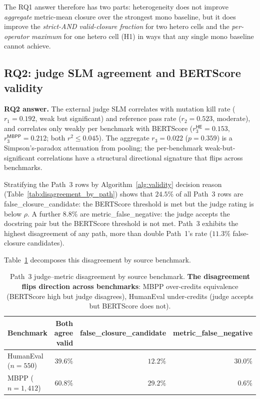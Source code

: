 The RQ1 answer therefore has two parts: heterogeneity does not improve \emph{aggregate} metric-mean closure over the strongest mono baseline, but it does improve the \emph{strict-AND valid-closure fraction} for two hetero cells and the \emph{per-operator maximum} for one hetero cell (H1) in ways that any single mono baseline cannot achieve.

\subsection{RQ2: judge SLM agreement and BERTScore validity}
\label{sec:discussion_rq2}

\textbf{RQ2 answer.} The external judge SLM correlates with mutation kill rate ($r_1 = 0.192$, weak but significant) and reference pass rate ($r_2 = 0.523$, moderate), and correlates only weakly per benchmark with BERTScore ($r_3^{\textsf{HE}} = 0.153$, $r_3^{\textsf{MBPP}} = 0.212$; both $r^2 \leq 0.045$). The aggregate $r_3 = 0.022$ ($p = 0.359$) is a Simpson's-paradox attenuation from pooling; the per-benchmark weak-but-significant correlations have a structural directional signature that flips across benchmarks.



Stratifying the Path~3 rows by Algorithm~\ref{alg:validity} decision reason (Table~\ref{tab:disagreement_by_path}) shows that $24.5\%$ of all Path~3 rows are \textsf{false\_closure\_candidate}: the BERTScore threshold is met but the judge rating is below $\rho$. A further $8.8\%$ are \textsf{metric\_false\_negative}: the judge accepts the docstring pair but the BERTScore threshold is not met. Path~3 exhibits the highest disagreement of any path, more than double Path~1's rate ($11.3\%$ false-closure candidates).

Table~\ref{tab:disagreement_p3_by_benchmark} decomposes this disagreement by source benchmark.

\begin{table}[htbp]
\centering
\small
\caption{Path~3 judge--metric disagreement by source benchmark. \textbf{The disagreement flips direction across benchmarks}: MBPP over-credits equivalence (BERTScore high but judge disagrees), HumanEval under-credits (judge accepts but BERTScore does not).}
\label{tab:disagreement_p3_by_benchmark}
\begin{tabular}{lrrr}
\toprule
Benchmark & Both agree valid & \textsf{false\_closure\_candidate} & \textsf{metric\_false\_negative} \\
\midrule
HumanEval ($n = 550$) & $39.6\%$ & $12.2\%$ & $\mathbf{30.0\%}$ \\
MBPP ($n = 1{,}412$) & $60.8\%$ & $\mathbf{29.2\%}$ & $0.6\%$ \\
\bottomrule
\end{tabular}
\end{table}


